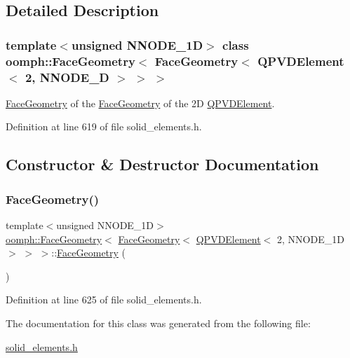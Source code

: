 \subsection{Detailed Description}
\subsubsection*{template$<$unsigned N\+N\+O\+D\+E\+\_\+1D$>$\newline
class oomph\+::\+Face\+Geometry$<$ Face\+Geometry$<$ Q\+P\+V\+D\+Element$<$ 2, N\+N\+O\+D\+E\+\_\+D $>$ $>$ $>$}

\hyperlink{classoomph_1_1FaceGeometry}{Face\+Geometry} of the \hyperlink{classoomph_1_1FaceGeometry}{Face\+Geometry} of the 2D \hyperlink{classoomph_1_1QPVDElement}{Q\+P\+V\+D\+Element}. 

Definition at line 619 of file solid\+\_\+elements.\+h.



\subsection{Constructor \& Destructor Documentation}
\mbox{\label{classoomph_1_1FaceGeometry_3_01FaceGeometry_3_01QPVDElement_3_012_00_01NNODE__1D_01_4_01_4_01_4_a5865335d09fe6d1de42cd21681336184}} 
\subsubsection{\texorpdfstring{Face\+Geometry()}{FaceGeometry()}}
{\footnotesize\ttfamily template$<$unsigned N\+N\+O\+D\+E\+\_\+1D$>$ \\
\hyperlink{classoomph_1_1FaceGeometry}{oomph\+::\+Face\+Geometry}$<$ \hyperlink{classoomph_1_1FaceGeometry}{Face\+Geometry}$<$ \hyperlink{classoomph_1_1QPVDElement}{Q\+P\+V\+D\+Element}$<$ 2, N\+N\+O\+D\+E\+\_\+1D $>$ $>$ $>$\+::\hyperlink{classoomph_1_1FaceGeometry}{Face\+Geometry} (\begin{DoxyParamCaption}{ }\end{DoxyParamCaption})\hspace{0.3cm}{\ttfamily [inline]}}



Definition at line 625 of file solid\+\_\+elements.\+h.



The documentation for this class was generated from the following file\+:\begin{DoxyCompactItemize}
\item 
\hyperlink{solid__elements_8h}{solid\+\_\+elements.\+h}\end{DoxyCompactItemize}
